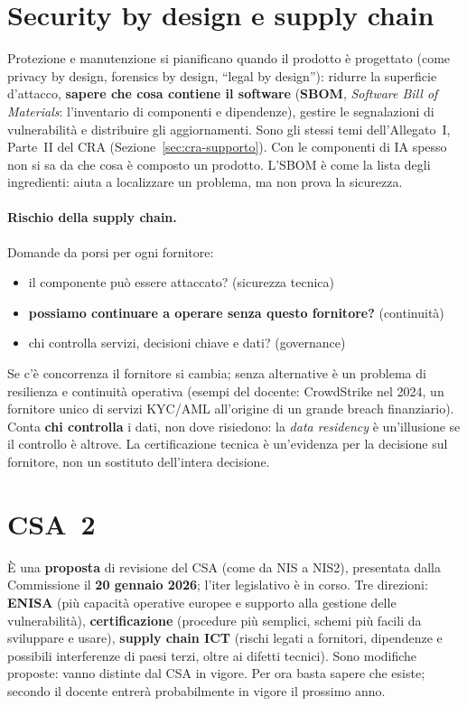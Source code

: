 \section{Security by design e supply chain}
\label{sec:csa-supplychain}

Protezione e manutenzione si pianificano quando il prodotto è progettato (come privacy by design,
forensics by design, ``legal by design''): ridurre la superficie d'attacco, \textbf{sapere che cosa
contiene il software} (\textbf{SBOM}, \emph{Software Bill of Materials}: l'inventario di componenti e dipendenze), gestire le
segnalazioni di vulnerabilità e distribuire gli
aggiornamenti. Sono gli stessi temi dell'Allegato~I, Parte~II del CRA (Sezione~\ref{sec:cra-supporto}).
Con le componenti di IA spesso non si sa da che cosa è composto un prodotto. L'SBOM è come la lista degli
ingredienti: aiuta a localizzare un problema, ma non prova la sicurezza.

\paragraph{Rischio della supply chain.} Domande da porsi per ogni fornitore:
\begin{itemize}
  \item il componente può essere attaccato? (sicurezza tecnica)
  \item \textbf{possiamo continuare a operare senza questo fornitore?} (continuità)
  \item chi controlla servizi, decisioni chiave e dati? (governance)
\end{itemize}
Se c'è concorrenza il fornitore si cambia; senza alternative è un problema di resilienza e continuità
operativa (esempi del docente: CrowdStrike nel 2024, un fornitore unico di servizi KYC/AML all'origine
di un grande breach finanziario). Conta \textbf{chi controlla} i dati, non dove risiedono: la
\emph{data residency} è un'illusione se il controllo è altrove. La certificazione tecnica è
un'evidenza per la decisione sul fornitore, non un sostituto dell'intera decisione.

\section{CSA~2}
\label{sec:csa-csa2}

È una \textbf{proposta} di revisione del CSA (come da NIS a NIS2), presentata dalla Commissione il
\textbf{20 gennaio 2026}; l'iter legislativo è in corso. Tre direzioni: \textbf{ENISA} (più capacità
operative europee e supporto alla gestione delle vulnerabilità), \textbf{certificazione} (procedure più
semplici, schemi più facili da sviluppare e usare), \textbf{supply chain ICT} (rischi legati a fornitori,
dipendenze e possibili interferenze di paesi terzi, oltre ai difetti tecnici). Sono modifiche proposte:
vanno distinte dal CSA in vigore. Per ora basta sapere che esiste; secondo il
docente entrerà probabilmente in vigore il prossimo anno.

